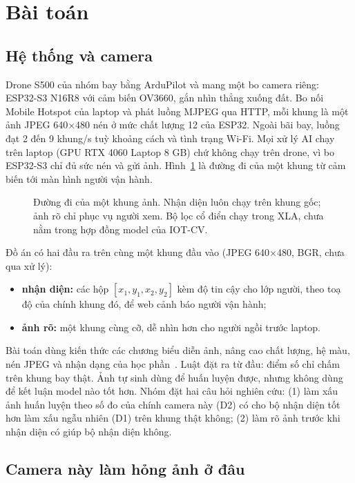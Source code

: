 \section{Bài toán}\label{sec:bai-toan}

\subsection{Hệ thống và camera}

Drone S500 của nhóm bay bằng ArduPilot và mang một bo camera riêng: ESP32-S3 N16R8 với cảm biến OV3660, gắn nhìn thẳng xuống đất. Bo nối Mobile Hotspot của laptop và phát luồng MJPEG qua HTTP, mỗi khung là một ảnh JPEG 640$\times$480 nén ở mức chất lượng 12 của ESP32. Ngoài bãi bay, luồng đạt 2 đến 9 khung/s tuỳ khoảng cách và tình trạng Wi-Fi. Mọi xử lý AI chạy trên laptop (GPU RTX 4060 Laptop 8 GB) chứ không chạy trên drone, vì bo ESP32-S3 chỉ đủ sức nén và gửi ảnh. Hình~\ref{fig:pipeline} là đường đi của một khung từ cảm biến tới màn hình người vận hành.

\begin{figure}[!htbp]
\centering

\caption[Đường đi của một khung ảnh]{Đường đi của một khung ảnh. Nhận diện luôn chạy trên khung gốc; ảnh rõ chỉ phục vụ người xem. Bộ lọc cổ điển chạy trong XLA, chưa nằm trong hợp đồng model của IOT-CV.}
\label{fig:pipeline}
\end{figure}

Đồ án có hai đầu ra trên cùng một khung đầu vào (JPEG 640$\times$480, BGR, chưa qua xử lý):
\begin{itemize}
\item \textbf{nhận diện:} các hộp $[x_1,y_1,x_2,y_2]$ kèm độ tin cậy cho lớp người, theo toạ độ của chính khung đó, để web cảnh báo người vận hành;
\item \textbf{ảnh rõ:} một khung cùng cỡ, dễ nhìn hơn cho người ngồi trước laptop.
\end{itemize}
Bài toán dùng kiến thức các chương biểu diễn ảnh, nâng cao chất lượng, hệ màu, nén JPEG và nhận dạng của học phần~\cite{baigiang,gonzalez}. Luật đặt ra từ đầu: điểm số chỉ chấm trên khung bay thật. Ảnh tự sinh dùng để huấn luyện được, nhưng không dùng để kết luận model nào tốt hơn. Nhóm đặt hai câu hỏi nghiên cứu: (1) làm xấu ảnh huấn luyện theo số đo của chính camera này (D2) có cho bộ nhận diện tốt hơn làm xấu ngẫu nhiên (D1) trên khung thật không; (2) làm rõ ảnh trước khi nhận diện có giúp bộ nhận diện không.

\subsection{Camera này làm hỏng ảnh ở đâu}

